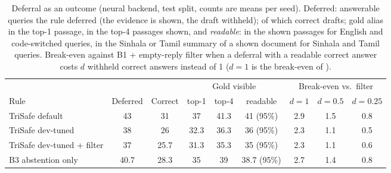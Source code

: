 \begin{table}[t]
  \caption{Deferral as an outcome (neural backend, test split, counts are means per seed). Deferred: answerable queries the rule deferred (the evidence is shown, the draft withheld); of which correct drafts; gold alias in the top-1 passage, in the top-4 passages shown, and \emph{readable}: in the shown passages for English and code-switched queries, in the Sinhala or Tamil summary of a shown document for Sinhala and Tamil queries. Break-even against B1 + empty-reply filter when a deferral with a readable correct answer costs $d$ withheld correct answers instead of 1 ($d{=}1$ is the break-even of \CostRef).}
  \label{tab:defer-neural}
  \scriptsize
  \setlength{\tabcolsep}{2pt}
  \begin{tabular}{@{}lcccccccc@{}}
    \toprule
    & & & \multicolumn{3}{c}{Gold visible} & \multicolumn{3}{c}{Break-even vs.\ filter} \\
    \cmidrule(lr){4-6} \cmidrule(lr){7-9}
    Rule & Deferred & Correct & top-1 & top-4 & readable & $d{=}1$ & $d{=}0.5$ & $d{=}0.25$ \\
    \midrule
    TriSafe default & 43 & 31 & 37 & 41.3 & 41 (95\%) & 2.9 & 1.5 & 0.8 \\
    TriSafe dev-tuned & 38 & 26 & 32.3 & 36.3 & 36 (95\%) & 2.3 & 1.1 & 0.5 \\
    TriSafe dev-tuned + filter & 37 & 25.7 & 31.3 & 35.3 & 35 (95\%) & 2.3 & 1.1 & 0.6 \\
    B3 abstention only & 40.7 & 28.3 & 35 & 39 & 38.7 (95\%) & 2.7 & 1.4 & 0.8 \\
    \bottomrule
  \end{tabular}
\end{table}
